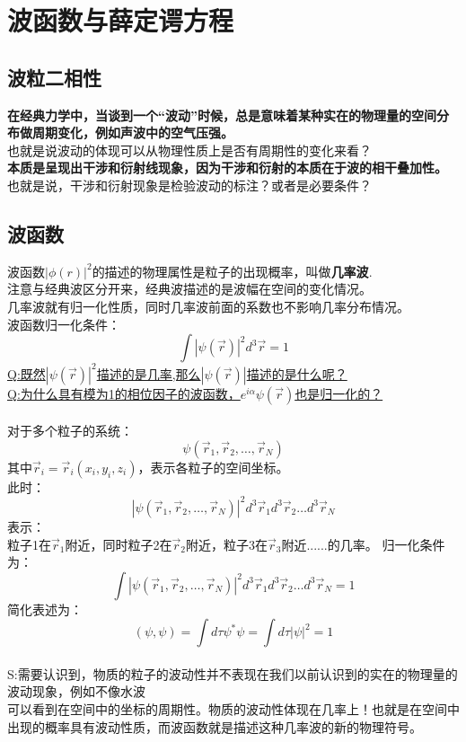 \newpage
\section{波函数与薛定谔方程}
\subsection{波粒二相性}
\textbf{ 在经典力学中，当谈到一个“波动”时候，总是意味着某种实在的物理量的空间分布做周期变化，例如声波中的空气压强。}\\
也就是说波动的体现可以从物理性质上是否有周期性的变化来看？\\
\textbf{本质是呈现出干涉和衍射线现象，因为干涉和衍射的本质在于波的相干叠加性。}\\
也就是说，干涉和衍射现象是检验波动的标注？或者是必要条件？\\

\subsection{波函数}
波函数$|\phi(r)|^2$的描述的物理属性是粒子的出现概率，叫做\textbf{几率波}.\\
注意与经典波区分开来，经典波描述的是波幅在空间的变化情况。\\
几率波就有归一化性质，同时几率波前面的系数也不影响几率分布情况。\\
波函数归一化条件：\\
\begin{equation}
    \int{|\psi(\vec{r})|^2}d^3\vec{r}=1
\end{equation}
\underline{Q:既然$|\psi(\vec{r})|^2$描述的是几率,那么$|\psi(\vec{r})|$描述的是什么呢？} \\
\underline{Q:为什么具有模为1的相位因子的波函数，$e^{i\alpha}\psi(\vec{r})$也是归一化的？}
 \\
 \\
对于多个粒子的系统：
\begin{equation}
   \psi (\vec{r}_1,\vec{r}_2,\dots ,\vec{r}_N)
\end{equation}
其中$\vec{r}_i=\vec{r}_i(x_i,y_i,z_i)$，表示各粒子的空间坐标。\\
此时：
\begin{equation}
    |\psi (\vec{r}_1,\vec{r}_2,\dots ,\vec{r}_N)|^2d^3\vec{r}_1d^3\vec{r}_2\dots d^3\vec{r}_N
 \end{equation}
 表示：\\
 粒子1在$\vec{r}_1$附近，同时粒子2在$\vec{r}_2$附近，粒子3在$\vec{r}_3$附近......的几率。
 归一化条件为：
 \begin{equation}
   \int |\psi (\vec{r}_1,\vec{r}_2,\dots ,\vec{r}_N)|^2d^3\vec{r}_1d^3\vec{r}_2\dots d^3\vec{r}_N=1
 \end{equation}
 简化表述为：\\
\begin{equation}
    (\psi,\psi)=\int d \tau \psi^*\psi=\int d \tau |\psi|^2=1
\end{equation}
\\
{S:需要认识到，物质的粒子的波动性并不表现在我们以前认识到的实在的物理量的波动现象，例如不像水波\\可以看到在空间中的坐标的周期性。物质的波动性体现在几率上！也就是在空间中出现的概率具有波动性质，而波函数就是描述这种几率波的新的物理符号。}
 
